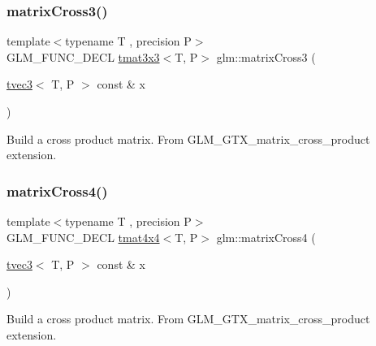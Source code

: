 \subsubsection{\texorpdfstring{matrix\+Cross3()}{matrixCross3()}}
{\footnotesize\ttfamily template$<$typename T , precision P$>$ \\
G\+L\+M\+\_\+\+F\+U\+N\+C\+\_\+\+D\+E\+CL \hyperlink{structglm_1_1tmat3x3}{tmat3x3}$<$T, P$>$ glm\+::matrix\+Cross3 (\begin{DoxyParamCaption}\item[{\hyperlink{structglm_1_1tvec3}{tvec3}$<$ T, P $>$ const \&}]{x }\end{DoxyParamCaption})}

Build a cross product matrix. From G\+L\+M\+\_\+\+G\+T\+X\+\_\+matrix\+\_\+cross\+\_\+product extension. \mbox{\label{group__gtx__matrix__cross__product_ga2d46cc5253761c214aa5c782865156b1}} 
\subsubsection{\texorpdfstring{matrix\+Cross4()}{matrixCross4()}}
{\footnotesize\ttfamily template$<$typename T , precision P$>$ \\
G\+L\+M\+\_\+\+F\+U\+N\+C\+\_\+\+D\+E\+CL \hyperlink{structglm_1_1tmat4x4}{tmat4x4}$<$T, P$>$ glm\+::matrix\+Cross4 (\begin{DoxyParamCaption}\item[{\hyperlink{structglm_1_1tvec3}{tvec3}$<$ T, P $>$ const \&}]{x }\end{DoxyParamCaption})}

Build a cross product matrix. From G\+L\+M\+\_\+\+G\+T\+X\+\_\+matrix\+\_\+cross\+\_\+product extension. 